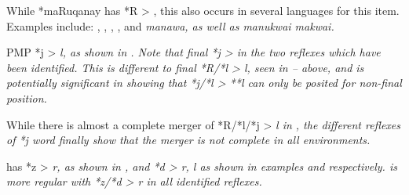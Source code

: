 While *maRuqanay has *R > {\0},
this also occurs in several  languages for this item.
Examples include: , ,
, , and  \it{manawa}, as well as  \it{manukwai {\tl} makwai}.

PMP *j > \it{l},
as shown in .
Note that final *j > {\0} in the two reflexes which have been identified.
This is different to final *R/*l > \it{l},
seen in -- above,
and is potentially significant in showing that  *j/*l
> **l can only be posited for non-final position.


While there is almost a complete merger of *R/*l/*j > \it{l}
in , the different reflexes of *j word finally show that the merger
is not complete in all environments.

\largerpage
{} has *z > \it{r},
as shown in , and *d > \it{r,
l} as shown in examples  and  respectively.
 is more regular with *z/*d > \it{r} in all identified reflexes.
\\

